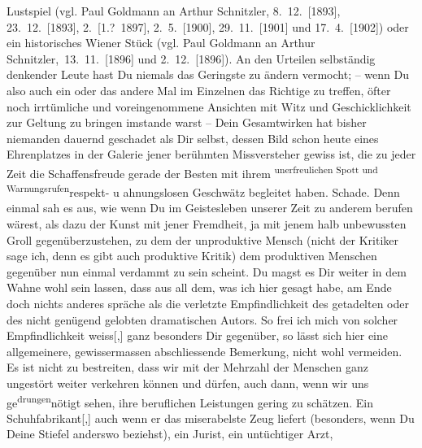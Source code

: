 \begin{ledgroupsized}[t]{13cm}
{{{                  Lustspiel (vgl. Paul Goldmann an Arthur Schnitzler, 8. 12. [1893], 23. 12. [1893], 2. [1.? 1897], 2. 5. [1900], 29. 11. [1901] und 17. 4. [1902]) oder ein
                  historisches Wiener Stück (vgl. Paul Goldmann an Arthur Schnitzler, 13. 11. [1896] und 2. 12. [1896])}}}\label{K_L03521-11h}. An den
               Urteilen selbständig denkender Leute hast Du niemals das Geringste zu ändern
               vermocht; – wenn Du also auch ein oder das andere Mal im Einzelnen das Richtige zu
               treffen, öfter noch irrtümliche und voreingenommene Ansichten mit Witz und
               Geschicklichkeit zur Geltung zu bringen imstande warst – Dein Gesamtwirken hat bisher
               niemanden dauernd geschadet als Dir selbst, dessen Bild schon heute eines
               Ehrenplatzes in der Galerie jener berühmten Missversteher gewiss ist, die zu jeder
               Zeit die Schaffensfreude gerade der Besten mit ihrem \substVorne{}\textsuperscript{unerfreulichen Spott und Warnungsrufen}{\allowbreak}\substDazwischen{}respekt- u ahnungslosen Geschwätz\substHinten{} begleitet haben. Schade. Denn einmal sah es aus, wie wenn Du im Geistesleben
               unserer Zeit zu anderem berufen wärest, als dazu der
               Kunst mit jener Fremdheit, ja mit jenem halb unbewussten Groll gegenüberzustehen, zu
               dem der unproduktive Mensch (nicht der Kritiker sage ich, denn es gibt auch
               produktive Kritik) dem produktiven Menschen gegenüber nun einmal verdammt zu {\pb}sein scheint.\pend
           \pstart
           Du magst es Dir weiter in dem Wahne wohl sein lassen, dass aus all dem, was ich hier
               gesagt habe, am Ende doch nichts anderes spräche als die verletzte Empfindlichkeit
               des getadelten oder des nicht genügend gelobten dramatischen Autors. So frei ich mich
               von solcher Empfindlichkeit weiss{[},{]} ganz besonders Dir gegenüber,
               so lässt sich hier eine \introOben{}allgemeinere\introOben{}, gewissermassen
               abschliessende Bemerkung, nicht wohl vermeiden. Es ist nicht zu bestreiten, dass wir
               mit der Mehrzahl der Menschen ganz ungestört weiter verkehren können und dürfen, auch
               dann, wenn wir uns ge\substVorne{}\textsuperscript{drungen}{\allowbreak}\substDazwischen{}nötigt\substHinten{} sehen, ihre beruflichen Leistungen gering zu schätzen. Ein
                  Schuhfabrikant{[},{]} auch wenn er das miserabelste Zeug liefert
               (besonders, wenn Du Deine Stiefel anderswo beziehst), ein \label{T_L03521-3v}\label{T_L03521-3h} Jurist, ein untüchtiger Arzt,

\end{ledgroupsized}
